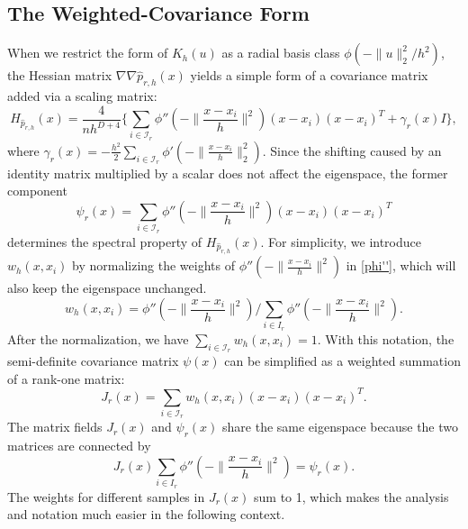 \documentclass[aos,preprint]{imsart}
\theoremstyle{remark}
\begin{document}
\subsection{The Weighted-Covariance Form}
When we restrict the form of $K_h(u)$ as a radial basis class $\phi(-\|u\|_2^2/h^2)$, the Hessian matrix $\nabla\nabla \hat{p}_{r,h}(x)$ yields a simple form of a covariance matrix added via a scaling matrix:
\begin{equation}\label{HP}
H_{\hat{p}_{r,h}}(x) =\frac{4}{nh^{D+4}}\{ \sum_{i\in {\mathcal I}_r } \phi''(-\|\frac{x-x_i}{h}\|^2)(x-x_i) (x-x_i)^T +\gamma_r(x)I\},
\end{equation}
where $\gamma_r(x) = -\frac{h^2}{2}\sum_{i\in {\mathcal I}_r} \phi'(-\|\frac{x-x_i}{h}\|_2^2)$.
Since the shifting caused by an identity matrix multiplied by a scalar does not affect the eigenspace, the former component
\begin{equation}\label{phi''}
\psi_r(x) = \sum_{i\in {\mathcal I}_r } \phi''(-\|\frac{x-x_i}{h}\|^2)(x-x_i) (x-x_i)^T
\end{equation}
determines the spectral property of $H_{\hat{p}_{r,h}}(x)$. For simplicity, we introduce $w_h(x, x_i)$ by normalizing the weights of $\phi''(-\|\frac{x-x_i}{h}\|^2)$ in \eqref{phi''}, which will also keep the eigenspace unchanged.
\[
w_h(x, x_i) = \phi''(-\|\frac{x-x_i}{h}\|^2)/\sum_{i\in I_r}\phi''(-\|\frac{x-x_i}{h}\|^2) .
\]
After the normalization, we have $\sum_{i \in {\mathcal I}_r} w_h(x, x_i) = 1$. With this notation, the semi-definite covariance matrix $\psi(x)$ can be simplified as a weighted summation of a rank-one matrix:
\begin{equation}\label{Jx}
J_r(x) = \sum_{i\in {\mathcal I}_r } w_h(x, x_i)(x-x_i) (x-x_i)^T.
\end{equation}
The matrix fields $J_r(x)$ and $\psi_r(x)$ share the same eigenspace because the two matrices are connected by
\[
J_r(x)\sum_{i\in I_r}\phi''(-\|\frac{x-x_i}{h}\|^2) =\psi_r(x).
\]
The weights for different samples in $J_r(x)$ sum to 1, which makes the analysis and notation much easier in the following context.
\end{document}
